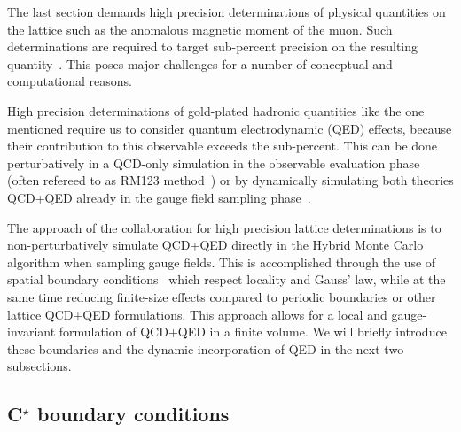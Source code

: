 

The last section demands high precision determinations of physical quantities on the lattice such as the anomalous magnetic moment of the muon.
Such determinations are required to 
target sub-percent precision on the resulting quantity~\cite{RBC_2024, bmw_2017, Djukanovic:2024cmq, bmw_2024, milc_gm2, ExtendedTwistedMass:2022jpw, FermilabLattice:2024yho,snowmass:2020,snowmass:2025}.
This poses major challenges for a number of conceptual and computational reasons.

High precision determinations of gold-plated hadronic quantities like the one mentioned require us to consider quantum electrodynamic (QED) effects, because their contribution to this observable exceeds the sub-percent.
This can be done perturbatively in a QCD-only simulation in the observable evaluation phase (often refereed to as RM123 method~\cite{deDivitiis:2011eh,deDivitiis:2013xla}) or by dynamically simulating both theories QCD+QED already in the gauge field sampling phase~\cite{Lucini:2015,10.1143/PTP.120.413,PhysRevLett.117.072002,Blum:2017cer,Feng:2018qpx}.

The approach of the \RCstar collaboration for high precision lattice determinations is to non-perturbatively simulate QCD+QED directly in the Hybrid Monte Carlo algorithm when sampling gauge fields.
This is accomplished through the use of \Cstar spatial boundary conditions~\cite{cstar:Wiese1992,cstar:Polley1993,cstar:Kronfeld1991,cstar:Kronfeld1993} which respect locality and Gauss' law, while at the same time reducing finite-size effects compared to periodic boundaries or other lattice QCD+QED formulations.
This approach allows for a local and gauge-invariant formulation of QCD+QED in a finite volume.
We will briefly introduce these boundaries and the dynamic incorporation of QED in the next two subsections.

\subsection{C\texorpdfstring{$^{\star}$}{*} boundary conditions}
\label{sec:intro:cstar}

